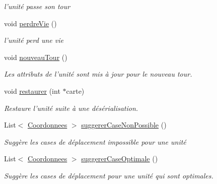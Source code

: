 \begin{DoxyCompactItemize}
\begin{DoxyCompactList}\small\item\em l'unité passe son tour \end{DoxyCompactList}\item 
\hypertarget{class_small_world_1_1_unite_a2a1197337d396419de11c69692bf446c}{void \hyperlink{class_small_world_1_1_unite_a2a1197337d396419de11c69692bf446c}{perdre\-Vie} ()}\label{class_small_world_1_1_unite_a2a1197337d396419de11c69692bf446c}

\begin{DoxyCompactList}\small\item\em l'unité perd une vie \end{DoxyCompactList}\item 
\hypertarget{class_small_world_1_1_unite_aab501a61112d2876a1065ebf2e99db2c}{void \hyperlink{class_small_world_1_1_unite_aab501a61112d2876a1065ebf2e99db2c}{nouveau\-Tour} ()}\label{class_small_world_1_1_unite_aab501a61112d2876a1065ebf2e99db2c}

\begin{DoxyCompactList}\small\item\em Les attributs de l'unité sont mis à jour pour le nouveau tour. \end{DoxyCompactList}\item 
void \hyperlink{class_small_world_1_1_unite_a6b703c7f442f922c6742f17d96bd2bb3}{restaurer} (int $\ast$carte)
\begin{DoxyCompactList}\small\item\em Restaure l'unité suite à une désérialisation. \end{DoxyCompactList}\item 
List$<$ \hyperlink{class_small_world_1_1_coordonnees}{Coordonnees} $>$ \hyperlink{class_small_world_1_1_unite_a79b7bc972bf0b76647be702cf94965fc}{suggerer\-Case\-Non\-Possible} ()
\begin{DoxyCompactList}\small\item\em Suggère les cases de déplacement impossible pour une unité \end{DoxyCompactList}\item 
List$<$ \hyperlink{class_small_world_1_1_coordonnees}{Coordonnees} $>$ \hyperlink{class_small_world_1_1_unite_a2da8fe0e076dbfccf553b6ecb6c9fc04}{suggerer\-Case\-Optimale} ()
\begin{DoxyCompactList}\small\item\em Suggère les cases de déplacement pour une unité qui sont optimales. \end{DoxyCompactList}\end{DoxyCompactItemize}
